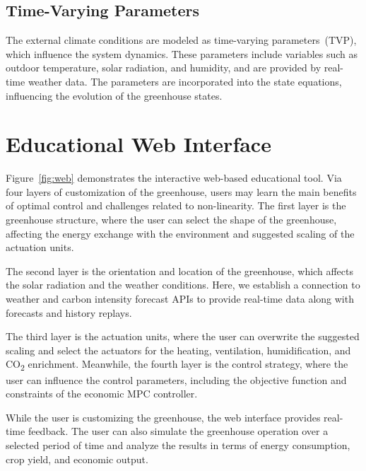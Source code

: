 \documentclass[conference]{IEEEtran}
\begin{document}
\subsection{Time-Varying Parameters}

The external climate conditions are modeled as time-varying parameters~(TVP), which influence the system dynamics. These parameters include variables such as outdoor temperature, solar radiation, and humidity, and are provided by real-time weather data. The parameters are incorporated into the state equations, influencing the evolution of the greenhouse states.

\section{Educational Web Interface}
Figure~\ref{fig:web} demonstrates the interactive web-based educational tool. Via four layers of customization of the greenhouse, users may learn the main benefits of optimal control and challenges related to non-linearity. The first layer is the greenhouse structure, where the user can select the shape of the greenhouse, affecting the energy exchange with the environment and suggested scaling of the actuation units.

The second layer is the orientation and location of the greenhouse, which affects the solar radiation and the weather conditions. Here, we establish a connection to weather and carbon intensity forecast APIs to provide real-time data along with forecasts and history replays.

The third layer is the actuation units, where the user can overwrite the suggested scaling and select the actuators for the heating, ventilation, humidification, and CO\textsubscript{2} enrichment. Meanwhile, the fourth layer is the control strategy, where the user can influence the control parameters, including the objective function and constraints of the economic MPC controller.

While the user is customizing the greenhouse, the web interface provides real-time feedback. The user can also simulate the greenhouse operation over a selected period of time and analyze the results in terms of energy consumption, crop yield, and economic output.
\end{document}
